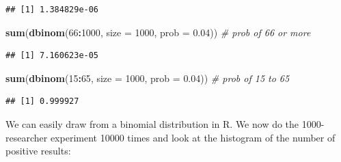 \documentclass[
]{book}
\newenvironment{Shaded}{\begin{snugshade}}{\end{snugshade}}
\newcommand{\AttributeTok}[1]{\textcolor[rgb]{0.13,0.29,0.53}{#1}}
\newcommand{\CommentTok}[1]{\textcolor[rgb]{0.56,0.35,0.01}{\textit{#1}}}
\newcommand{\DecValTok}[1]{\textcolor[rgb]{0.00,0.00,0.81}{#1}}
\newcommand{\FloatTok}[1]{\textcolor[rgb]{0.00,0.00,0.81}{#1}}
\newcommand{\FunctionTok}[1]{\textcolor[rgb]{0.13,0.29,0.53}{\textbf{#1}}}
\newcommand{\NormalTok}[1]{#1}
\newcommand{\SpecialCharTok}[1]{\textcolor[rgb]{0.81,0.36,0.00}{\textbf{#1}}}
\begin{document}
\begin{verbatim}
## [1] 1.384829e-06
\end{verbatim}

\begin{Shaded}
\begin{Highlighting}[]
\FunctionTok{sum}\NormalTok{(}\FunctionTok{dbinom}\NormalTok{(}\DecValTok{66}\SpecialCharTok{:}\DecValTok{1000}\NormalTok{, }\AttributeTok{size =} \DecValTok{1000}\NormalTok{, }\AttributeTok{prob =} \FloatTok{0.04}\NormalTok{)) }\CommentTok{\# prob of 66 or more}
\end{Highlighting}
\end{Shaded}

\begin{verbatim}
## [1] 7.160623e-05
\end{verbatim}

\begin{Shaded}
\begin{Highlighting}[]
\FunctionTok{sum}\NormalTok{(}\FunctionTok{dbinom}\NormalTok{(}\DecValTok{15}\SpecialCharTok{:}\DecValTok{65}\NormalTok{, }\AttributeTok{size =} \DecValTok{1000}\NormalTok{, }\AttributeTok{prob =} \FloatTok{0.04}\NormalTok{)) }\CommentTok{\# prob of 15 to 65}
\end{Highlighting}
\end{Shaded}

\begin{verbatim}
## [1] 0.999927
\end{verbatim}

We can easily draw from a binomial distribution in R.
We now do the 1000-researcher experiment 10000 times and look at
the histogram of the number of positive results:
\end{document}
